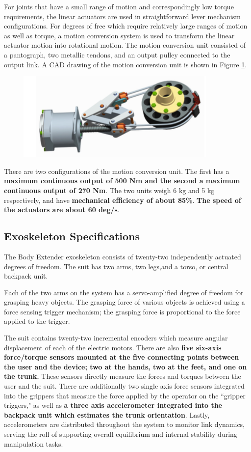  For joints that have a small range of motion and correspondingly low torque requirements, the linear actuators are used in straightforward lever mechanism configurations.  For degrees of free which require relatively large ranges of motion as well as torque, a motion conversion system is used to transform the linear actuator motion into rotational motion.  The motion conversion unit consisted of a pantograph, two metallic tendons, and an output pulley connected to the output link.  A CAD drawing of the motion conversion unit is shown in Figure \ref{fig:motionConv}. 
 \begin{figure}[thpb]
\centering
\includegraphics[width=3.in]{exos/figs/bodyExt/motionConv}
  \caption{}
 \label{fig:motionConv}   
 \end{figure}
 There are two configurations of the motion conversion unit.  The first has a {\bf maximum continuous output of 500 Nm and the second a maximum continuous output of 270 Nm}.  The two units weigh 6 kg and 5 kg respectively, and have {\bf mechanical efficiency of about 85\%}.  {\bf The speed of the actuators are about 60 deg/s}.
 
 
 \subsection{Exoskeleton Specifications}
 
 The Body Extender exoskeleton consists of twenty-two independently actuated degrees of freedom.  The suit has two arms, two legs,and a torso, or central backpack unit.  
 
 Each of the two arms on the system has a servo-amplified degree of freedom for grasping heavy objects.  The grasping force of various objects is achieved using a force sensing trigger mechanism; the grasping force is proportional to the force applied to the trigger.
 
 The suit contains twenty-two incremental encoders which measure angular displacement of each of the electric motors.  There are also {\bf five six-axis force/torque sensors mounted at the five connecting points between the user and the device; two at the hands, two at the feet, and one on the trunk.}  These sensors directly measure the forces and torques between the user and the suit.  There are additionally two single axis force sensors integrated into the grippers that measure the force applied by the operator on the ``gripper triggers," as well as {\bf a three axis accelerometer integrated into the backpack unit which estimates the trunk orientation}.  Lastly, accelerometers are distributed throughout the system to monitor link dynamics, serving the roll of supporting overall equilibrium and internal stability during manipulation tasks.   
 

